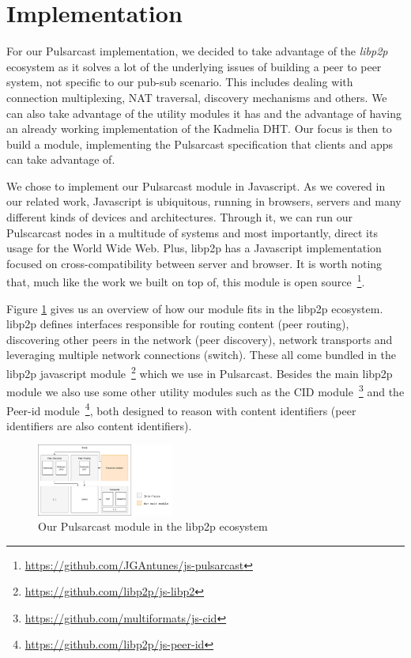 
\section{Implementation}
\label{section:implementation}

For our Pulsarcast implementation, we decided to take advantage of the
\emph{libp2p} ecosystem as it solves a lot of the underlying issues of building
a peer to peer system, not specific to our pub-sub scenario. This includes
dealing with connection multiplexing, NAT traversal, discovery mechanisms and
others. We can also take advantage of the utility modules it has and the
advantage of having an already working implementation of the Kadmelia DHT. Our
focus is then to build a module, implementing the Pulsarcast specification that
clients and apps can take advantage of. 

We chose to implement our Pulsarcast module in Javascript. As we covered in our
related work, Javascript is ubiquitous, running in browsers, servers and many
different kinds of devices and architectures. Through it, we can run our
Pulscarcast nodes in a multitude of systems and most importantly, direct its
usage for the World Wide Web. Plus, libp2p has a Javascript implementation
focused on cross-compatibility between server and browser. It is worth
noting that, much like the work we built on top of, this module is open
source~\footnote{\url{https://github.com/JGAntunes/js-pulsarcast}}.

Figure \ref{fig:pulsarcast-in-libp2p} gives us an overview of how our module
fits in the libp2p ecosystem. libp2p defines interfaces responsible for routing
content (peer routing), discovering other peers in the network (peer
discovery), network transports and leveraging multiple network connections
(switch). These all come bundled in the libp2p javascript
module~\footnote{\url{https://github.com/libp2p/js-libp2}} which we use in
Pulsarcast. Besides the main libp2p module we also use some other utility
modules such as the CID
module~\footnote{\url{https://github.com/multiformats/js-cid}} and the Peer-id
module~\footnote{\url{https://github.com/libp2p/js-peer-id}}, both designed to
reason with content identifiers (peer identifiers are also content
identifiers). 

\begin{figure}[hb!]
  \centering
  \includegraphics[width=0.4\textwidth]{../images/pulsarcast-in-libp2p.png}
  \caption{Our Pulsarcast module in the libp2p ecosystem}
  \label{fig:pulsarcast-in-libp2p}
\end{figure}


